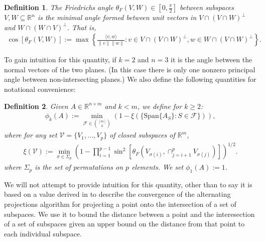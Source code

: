 \documentclass[journal, onecolumn]{IEEEtran}
\newtheorem{definition}{Definition}
\begin{document}
\begin{definition}\label{FriedrichsDefinition}
The \emph{Friedrichs angle} $\theta_F(V,W) \in [0,\frac{\pi}{2}]$ between subspaces $V,W \subseteq \mathbb{R}^n$ is the minimal angle formed between unit vectors in $V \cap (V \cap W)^\perp$ and $W \cap (W \cap V)^\perp$. That is,
\begin{align}
\cos\left[\theta_F(V,W)\right] := \max\left\{ \frac{ \langle v, w \rangle }{\|v\|\|w\|}: v \in V \cap (V \cap W)^\perp, w \in W \cap (V \cap W)^\perp \right\}.
\end{align}
\end{definition}

To gain intuition for this quantity, if $k=2$ and $n=3$ it is the angle between the normal vectors of the two planes. (In this case there is only one nonzero principal angle between non-intersecting planes.) We also define the following quantities for notational convenience:

\begin{definition}\label{SpecialSupportSet}
Given $A \in \mathbb{R}^{n \times m}$ and $k < m$, we define for $k \geq 2$:
\begin{align}\label{rho}
\phi_k(A) := \min_{ \mathcal{F} \in {[m] \choose k} } \left(1 - \xi( \{\text{Span}\{A_S\} : S \in \mathcal{F} \} ) \right),
\end{align}
%
where for any set $\mathcal{V} = \{V_1, \ldots, V_p\}$ of closed subspaces of $\mathbb{R}^m$, 
\begin{align}
\xi(\mathcal{V}) := \min_{\sigma \in \Sigma_p} \left(1 - \prod_{i=1}^{p-1} \sin^2\left[ \theta_F(V_{\sigma(i)}, \cap_{j=i+1}^p V_{\sigma(j)}) \right]  \right)^{1/2}.
\end{align}
%
where $\Sigma_p$ is the set of permutations on $p$ elements. We set $\phi_1(A) := 1$.
\end{definition}

We will not attempt to provide intuition for this quantity, other than to say it is based on a value derived in \cite{Deutsch} to describe the convergence of the alternating projections algorithm for projecting a point onto the intersection of a set of subspaces. We use it to bound the distance between a point and the interesection of a set of subspaces given an upper bound on the distance from that point to each individual subspace. 

\end{document}
